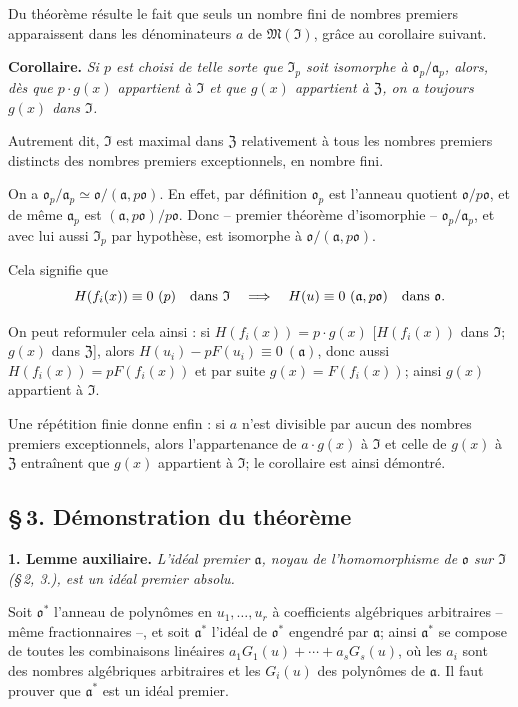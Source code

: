 Du théorème résulte le fait que seuls un nombre fini de nombres premiers apparaissent dans les dénominateurs $a$ de $\mathfrak{M}(\mathfrak{I})$, grâce au corollaire suivant.

\medskip
\noindent\textbf{Corollaire.}
\textit{Si $p$ est choisi de telle sorte que $\mathfrak{I}_p$ soit isomorphe à $\mathfrak{o}_p/\mathfrak{a}_p$, alors, dès que $p\cdot g(x)$ appartient à $\mathfrak{I}$ et que $g(x)$ appartient à $\mathfrak{Z}$, on a toujours $g(x)$ dans $\mathfrak{I}$.}

Autrement dit, $\mathfrak{I}$ est maximal dans $\mathfrak{Z}$ relativement à tous les nombres premiers distincts des nombres premiers exceptionnels, en nombre fini.

On a $\mathfrak{o}_p/\mathfrak{a}_p\simeq\mathfrak{o}/(\mathfrak{a},p\mathfrak{o})$. En effet, par définition $\mathfrak{o}_p$ est l'anneau quotient $\mathfrak{o}/p\mathfrak{o}$, et de même $\mathfrak{a}_p$ est $(\mathfrak{a},p\mathfrak{o})/p\mathfrak{o}$. Donc -- premier théorème d'isomorphie -- $\mathfrak{o}_p/\mathfrak{a}_p$, et avec lui aussi $\mathfrak{I}_p$ par hypothèse, est isomorphe à $\mathfrak{o}/(\mathfrak{a},p\mathfrak{o})$.

Cela signifie que
\[
H(f_i(x))\equiv0\ (p)\quad\hbox{dans }\mathfrak{I}
\quad\Longrightarrow\quad
H(u)\equiv0\ (\mathfrak{a},p\mathfrak{o})\quad\hbox{dans }\mathfrak{o}.
\]

On peut reformuler cela ainsi : si $H(f_i(x))=p\cdot g(x)$ [$H(f_i(x))$ dans $\mathfrak{I}$; $g(x)$ dans $\mathfrak{Z}$], alors $H(u_i)-pF(u_i)\equiv0\ (\mathfrak{a})$, donc aussi $H(f_i(x))=pF(f_i(x))$ et par suite $g(x)=F(f_i(x))$; ainsi $g(x)$ appartient à $\mathfrak{I}$.

Une répétition finie donne enfin : si $a$ n'est divisible par aucun des nombres premiers exceptionnels, alors l'appartenance de $a\cdot g(x)$ à $\mathfrak{I}$ et celle de $g(x)$ à $\mathfrak{Z}$ entraînent que $g(x)$ appartient à $\mathfrak{I}$; le corollaire est ainsi démontré.

\subsection*{\S\,3. Démonstration du théorème}

\smallskip
\noindent\textbf{1. Lemme auxiliaire.}
\textit{L'idéal premier $\mathfrak{a}$, noyau de l'homomorphisme de $\mathfrak{o}$ sur $\mathfrak{I}$ (\S\,2, 3.), est un idéal premier absolu.}

Soit $\mathfrak{o}^*$ l'anneau de polynômes en $u_1,\ldots,u_r$ à coefficients algébriques arbitraires -- même fractionnaires --, et soit $\mathfrak{a}^*$ l'idéal de $\mathfrak{o}^*$ engendré par $\mathfrak{a}$; ainsi $\mathfrak{a}^*$ se compose de toutes les combinaisons linéaires $a_1G_1(u)+\cdots+a_sG_s(u)$, où les $a_i$ sont des nombres algébriques arbitraires et les $G_i(u)$ des polynômes de $\mathfrak{a}$. Il faut prouver que $\mathfrak{a}^*$ est un idéal premier.

